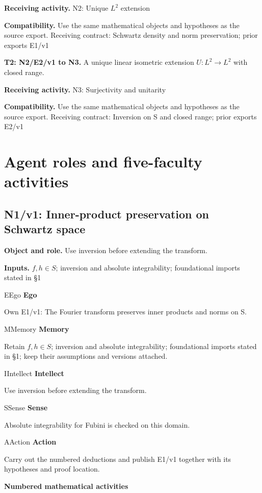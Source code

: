 \documentclass[preprint,12pt,aps,pra,showkeys,amsmath,amssymb,superscriptaddress,floatfix]{revtex4-2}
\theoremstyle{definition}
\theoremstyle{remark}
\newcommand{\mmfaculty}[3]{%
 \begin{mmfacultybox}{#1}{#2}
 {\sffamily\bfseries\color{MMBlue}#2}\par\smallskip #3
 \end{mmfacultybox}}
\newcommand{\field}[2]{\par\smallskip\noindent\textbf{#1.} #2\par}
\begin{document}
\field{Receiving activity}{N2: Unique \(L^{2}\) extension}

\field{Compatibility}{Use the same mathematical objects and hypotheses as the source export.
Receiving contract: Schwartz density and norm preservation; prior
exports E1/v1}

\field{T2: N2/E2/v1 to N3}{A unique linear isometric extension \(U:L^{2}\to L^{2}\) with closed
range.}

\field{Receiving activity}{N3: Surjectivity and unitarity}

\field{Compatibility}{Use the same mathematical objects and hypotheses as the source export.
Receiving contract: Inversion on S and closed range; prior exports E2/v1}

\endgroup

\clearpage\section{Agent roles and five-faculty activities}\begingroup\small\linespread{1.05}\selectfont{}

\subsection{N1/v1: Inner-product preservation on Schwartz space}

\field{Object and role}{Use inversion before extending the transform.}

\field{Inputs}{\(f,h\in S\); inversion and absolute integrability; foundational imports
stated in §1}

\mmfaculty{E}{Ego}{Own E1/v1: The Fourier transform preserves inner products and norms on
S.}

\mmfaculty{M}{Memory}{Retain \(f,h\in S\); inversion and absolute integrability; foundational
imports stated in §1; keep their assumptions and versions attached.}

\mmfaculty{I}{Intellect}{Use inversion before extending the transform.}

\mmfaculty{S}{Sense}{Absolute integrability for Fubini is checked on this domain.}

\mmfaculty{A}{Action}{Carry out the numbered deductions and publish E1/v1 together with its
hypotheses and proof location.}

\smallskip\noindent\textbf{Numbered mathematical activities}
\end{document}
